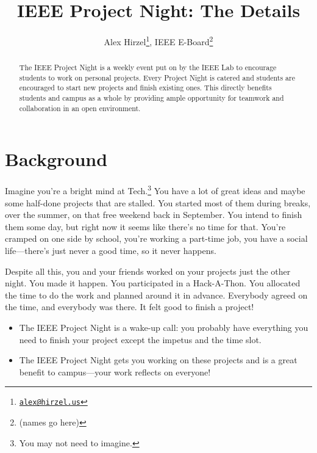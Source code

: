 \documentclass{article}
\begin{document}
\title{IEEE Project Night: The Details}
\author{
Alex Hirzel\thanks{\href{mailto:alex@hirzel.us}{\texttt{alex@hirzel.us}}},
IEEE E-Board\thanks{(names go here)}}
\maketitle

\begin{abstract}
The IEEE Project Night is a weekly event put on by the IEEE Lab to encourage
students to work on personal projects. Every Project Night is catered and
students are encouraged to start new projects and finish existing ones. This
directly benefits students and campus as a whole by providing ample opportunity
for teamwork and collaboration in an open environment.
\end{abstract}

\tableofcontents

\newpage


\section{Background}

Imagine you're a bright mind at Tech.\footnote{You may not need to imagine.} You
have a lot of great ideas and maybe some half-done projects that are stalled.
You started most of them during breaks, over the summer, on that free weekend
back in September. You intend to finish them some day, but right now it seems
like there's no time for that. You're cramped on one side by school, you're
working a part-time job, you have a social life---there's just never a good
time, so it never happens.

Despite all this, you and your friends worked on your projects just the other
night. You made it happen. You participated in a Hack-A-Thon. You allocated the
time to do the work and planned around it in advance. Everybody agreed on the
time, and everybody was there. It felt good to finish a project!

\begin{itemize}
\item The IEEE Project Night is a wake-up call: you probably have everything you
need to finish your project except the impetus and the time slot.
\item The IEEE Project Night gets you working on these projects and is a great
benefit to campus---your work reflects on everyone!
\end{itemize}
\end{document}
